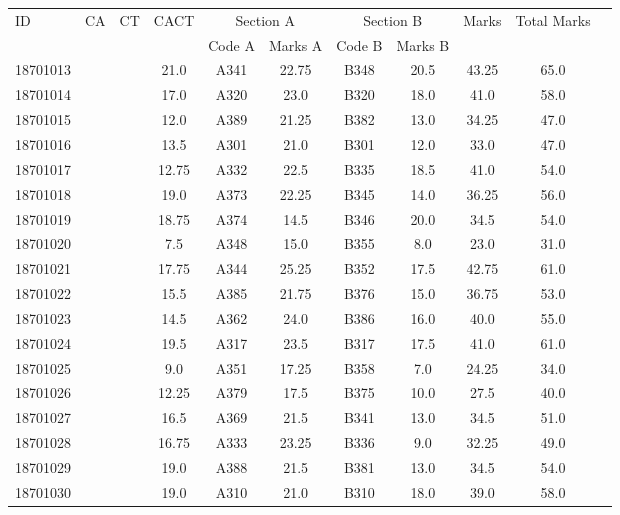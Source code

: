 \documentclass[12pt]{article}
\begin{document}
    \begin{center} 
	\renewcommand{\arraystretch}{1.08}
	\begin{small}
    \begin{tabular}{|l|c|c|c|c|c|c|c|c|c|c|} \hline
	\multirow{2}{*}{ID} & 	\multirow{2}{*}{CA}  & 	\multirow{2}{*}{CT}  & 	\multirow{2}{*}{CACT}  & \multicolumn{2 }{|c|}{Section A}& \multicolumn{2 }{c|}{Section B} & 	\multirow{2}{*}{Marks}  & 	\multirow{2}{*}{Total Marks}  \\ 
	&  &  &  & Code A & Marks A & Code B & Marks B&  &  \\ \hline
18701013 &  &  & 21.0 & A341 & 22.75 & B348 & 20.5 & 43.25 & 65.0\\ \hline 
18701014 &  &  & 17.0 & A320 & 23.0 & B320 & 18.0 & 41.0 & 58.0\\ \hline 
18701015 &  &  & 12.0 & A389 & 21.25 & B382 & 13.0 & 34.25 & 47.0\\ \hline 
18701016 &  &  & 13.5 & A301 & 21.0 & B301 & 12.0 & 33.0 & 47.0\\ \hline 
18701017 &  &  & 12.75 & A332 & 22.5 & B335 & 18.5 & 41.0 & 54.0\\ \hline 
18701018 &  &  & 19.0 & A373 & 22.25 & B345 & 14.0 & 36.25 & 56.0\\ \hline 
18701019 &  &  & 18.75 & A374 & 14.5 & B346 & 20.0 & 34.5 & 54.0\\ \hline 
18701020 &  &  & 7.5 & A348 & 15.0 & B355 & 8.0 & 23.0 & 31.0\\ \hline 
18701021 &  &  & 17.75 & A344 & 25.25 & B352 & 17.5 & 42.75 & 61.0\\ \hline 
18701022 &  &  & 15.5 & A385 & 21.75 & B376 & 15.0 & 36.75 & 53.0\\ \hline 
18701023 &  &  & 14.5 & A362 & 24.0 & B386 & 16.0 & 40.0 & 55.0\\ \hline 
18701024 &  &  & 19.5 & A317 & 23.5 & B317 & 17.5 & 41.0 & 61.0\\ \hline 
18701025 &  &  & 9.0 & A351 & 17.25 & B358 & 7.0 & 24.25 & 34.0\\ \hline 
18701026 &  &  & 12.25 & A379 & 17.5 & B375 & 10.0 & 27.5 & 40.0\\ \hline 
18701027 &  &  & 16.5 & A369 & 21.5 & B341 & 13.0 & 34.5 & 51.0\\ \hline 
18701028 &  &  & 16.75 & A333 & 23.25 & B336 & 9.0 & 32.25 & 49.0\\ \hline 
18701029 &  &  & 19.0 & A388 & 21.5 & B381 & 13.0 & 34.5 & 54.0\\ \hline 
18701030 &  &  & 19.0 & A310 & 21.0 & B310 & 18.0 & 39.0 & 58.0\\ \hline 

\end{tabular}
\end{small}
\end{center}
\end{document}
